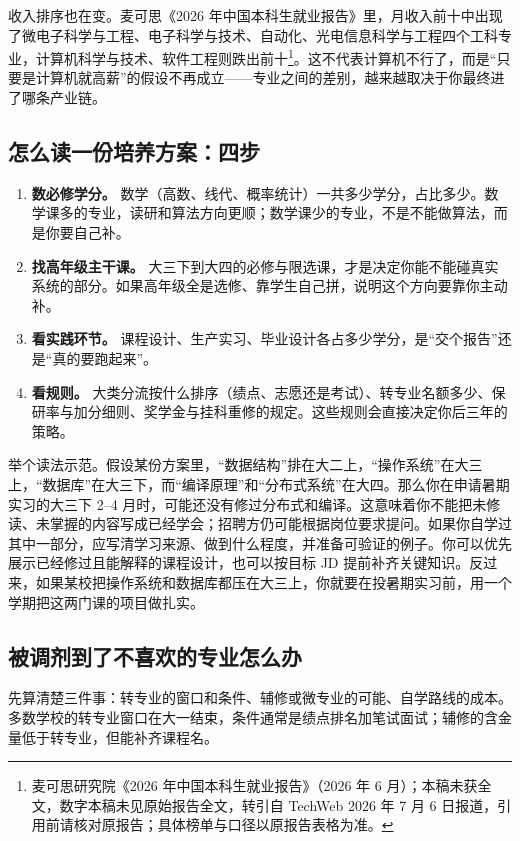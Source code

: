 \documentclass[UTF8,zihao=5,openany]{ctexbook}
\begin{document}
收入排序也在变。麦可思《2026 年中国本科生就业报告》里，月收入前十中出现了微电子科学与工程、电子科学与技术、自动化、光电信息科学与工程四个工科专业，计算机科学与技术、软件工程则跌出前十\footnote{麦可思研究院《2026 年中国本科生就业报告》（2026 年 6 月）；本稿未获全文，数字本稿未见原始报告全文，转引自 TechWeb 2026 年 7 月 6 日报道，引用前请核对原报告；具体榜单与口径以原报告表格为准。}。这不代表计算机不行了，而是“只要是计算机就高薪”的假设不再成立——专业之间的差别，越来越取决于你最终进了哪条产业链。

\subsection{怎么读一份培养方案：四步}
\begin{enumerate}
\item \textbf{数必修学分。} 数学（高数、线代、概率统计）一共多少学分，占比多少。数学课多的专业，读研和算法方向更顺；数学课少的专业，不是不能做算法，而是你要自己补。
\item \textbf{找高年级主干课。} 大三下到大四的必修与限选课，才是决定你能不能碰真实系统的部分。如果高年级全是选修、靠学生自己拼，说明这个方向要靠你主动补。
\item \textbf{看实践环节。} 课程设计、生产实习、毕业设计各占多少学分，是“交个报告”还是“真的要跑起来”。
\item \textbf{看规则。} 大类分流按什么排序（绩点、志愿还是考试）、转专业名额多少、保研率与加分细则、奖学金与挂科重修的规定。这些规则会直接决定你后三年的策略。
\end{enumerate}

举个读法示范。假设某份方案里，“数据结构”排在大二上，“操作系统”在大三上，“数据库”在大三下，而“编译原理”和“分布式系统”在大四。那么你在申请暑期实习的大三下 2--4 月时，可能还没有修过分布式和编译。这意味着你不能把未修读、未掌握的内容写成已经学会；招聘方仍可能根据岗位要求提问。如果你自学过其中一部分，应写清学习来源、做到什么程度，并准备可验证的例子。你可以优先展示已经修过且能解释的课程设计，也可以按目标 JD 提前补齐关键知识。反过来，如果某校把操作系统和数据库都压在大三上，你就要在投暑期实习前，用一个学期把这两门课的项目做扎实。

\subsection{被调剂到了不喜欢的专业怎么办}
先算清楚三件事：转专业的窗口和条件、辅修或微专业的可能、自学路线的成本。多数学校的转专业窗口在大一结束，条件通常是绩点排名加笔试面试；辅修的含金量低于转专业，但能补齐课程名。
\end{document}
